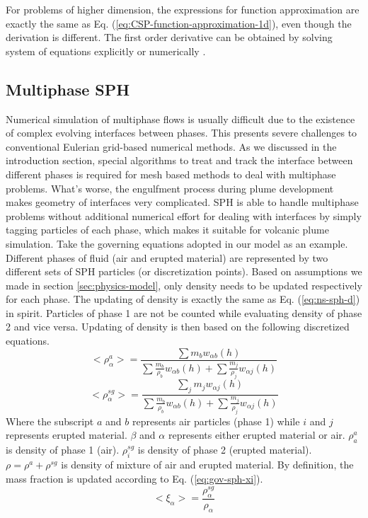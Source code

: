 \documentclass[journal abbreviation, manuscript]{copernicus}
\begin{document}
For problems of higher dimension, the expressions for function approximation are exactly the same as Eq. (\ref{eq:CSP-function-approximation-1d}), even though the derivation is different. The first order derivative can be obtained by solving system of equations explicitly or numerically \citep{chen1999improvement}.

\subsection{Multiphase SPH}
Numerical simulation of multiphase flows is usually difficult due to the existence of complex evolving interfaces between phases.  This presents severe challenges to conventional Eulerian grid-based numerical methods. As we discussed in the introduction section, special algorithms to treat and track the interface between different phases is required for mesh based methods to deal with multiphase problems. What's worse, the engulfment process during plume development makes geometry of interfaces very complicated. SPH is able to handle multiphase problems without additional numerical effort for dealing with interfaces by simply tagging particles of each phase, which makes it suitable for volcanic plume simulation. Take the governing equations adopted in our model as an example. Different phases of fluid (air and erupted material) are represented by two different sets of SPH particles (or discretization points). Based on assumptions we made in section \ref{sec:physics-model}, only density needs to be updated respectively for each phase. The updating of density is exactly the same as Eq. (\ref{eq:ns-sph-d}) in spirit.  Particles of phase 1 are not be counted while evaluating density of phase 2 and vice versa. Updating of density is then based on the following discretized equations.
\begin{equation}
<\rho_{\alpha}^a>=\frac{\sum m_b w_{\alpha b} \left(h\right)}{\sum \frac{m_b}{\rho_b} w_{\alpha b} \left(h\right) +\sum \frac{m_j}{\rho_j} w_{\alpha j} \left(h\right)} \label{eq:gov-sph-d1}
\end{equation}
\begin{equation}
<\rho_\alpha^{sg}>=\frac{\sum_j m_j w_{\alpha j} \left(h\right)}{\sum \frac{m_b}{\rho_b} w_{\alpha b} \left(h\right) +\sum \frac{m_j}{\rho_j} w_{\alpha j} \left(h\right)} \label{eq:gov-sph-d2}
\end{equation}
Where the subscript $a$ and $b$ represents air particles (phase 1) while $i$ and $j$ represents erupted material. $\beta$ and $\alpha$ represents either erupted material or air.
$\rho_a^a$ is density of phase 1 (air). 
 $\rho_i^{sg}$ is density of phase 2 (erupted material).
$\rho=\rho^a + \rho^{sg}$ is density of mixture of air and erupted material. By definition, the mass fraction is updated according to Eq. (\ref{eq:gov-sph-xi}).
\begin{equation}
<\xi_{\alpha}> = \dfrac{\rho^{sg}_{\alpha}}{\rho_{\alpha}}
\label{eq:gov-sph-xi}
\end{equation}
\end{document}
